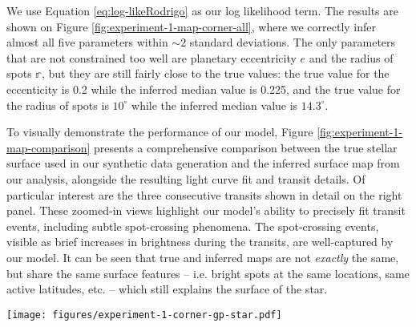 \documentclass[twocolumn]{aastex631}
\begin{document}
We use Equation \ref{eq:log-likeRodrigo} as our log likelihood term. The results are shown on Figure \ref{fig:experiment-1-map-corner-all},
where we correctly infer almost all five parameters within $\sim 2$ standard deviations. The only parameters that are not constrained too well are 
planetary eccentricity $e$ and the radius of spots $\mathbb{r}$, but they are still fairly close to the true values: the true value for the
eccenticity is 0.2 while the inferred median value is 0.225, and the true value for the radius of spots is $10^\circ$ while the inferred median value is
$14.3^\circ$. 

To visually demonstrate the performance of our model, Figure \ref{fig:experiment-1-map-comparison} presents a comprehensive comparison between 
the true stellar surface used in our synthetic data generation and the inferred surface map from our analysis, alongside the resulting light curve fit and 
transit details. Of particular interest are the three consecutive transits shown in detail on the right panel. These zoomed-in views highlight our 
model's ability to precisely fit transit events, including subtle spot-crossing phenomena. The spot-crossing events, visible as brief increases in brightness 
during the transits, are well-captured by our model. It can be seen that true and inferred maps are not \emph{exactly} the same, but share the same surface features -- i.e. bright spots at the
same locations, same active latitudes, etc. -- which still explains the surface of the star.
%
\begin{figure*}[hbt!]
    \begin{centering}
        \texttt{[image: figures/experiment-1-corner-gp-star.pdf]}
        \caption{
            Posterior distributions for the all the parameters $\pmb{\Theta}$ for the synthetic data run 
            (Table \ref{tab:LongPriors} and Figure \ref{fig:experiment-1-map}). The axes span the entire prior volume, and 
            the black lines indicate the true (input) values, the dashed black lines indicate 2 standard deviations.
        }
        \label{fig:experiment-1-map-corner-all}
    \end{centering}
\end{figure*}
%
\end{document}
